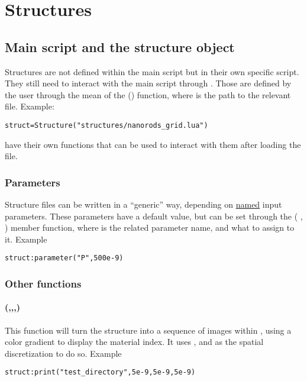 \chapter{Structures}
\label{geomsection}

\section{Main script and the structure object}

Structures are not defined within the main script but in their own specific script. They still need to interact with the main script through . Those are defined by the user through the mean of the () function, where  is the path to the relevant file. Example:
\begin{lstlisting}
struct=Structure("structures/nanorods_grid.lua")
\end{lstlisting}

 have their own functions that can be used to interact with them after loading the file.

\subsection{Parameters}
\label{structure_parameters}

Structure files can be written in a ``generic'' way, depending on \underline{named} input parameters. These parameters have a default value, but can be set through the ( , ) member function, where  is the related parameter name, and  what to assign to it. Example
\begin{lstlisting}
struct:parameter("P",500e-9)
\end{lstlisting}

\subsection{Other functions}

\subsubsection[print]{(,,,)}

This function will turn the structure into a sequence of images within , using a color gradient to display the material index. It uses ,  and  as the spatial discretization to do so. Example
\begin{lstlisting}
struct:print("test_directory",5e-9,5e-9,5e-9)
\end{lstlisting}

